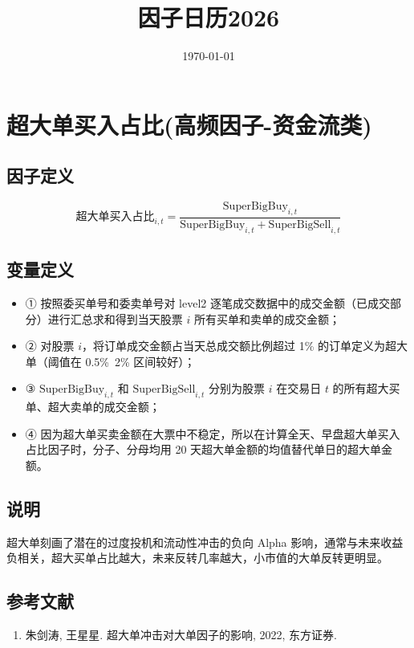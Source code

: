 \documentclass{article}
\title{因子日历2026}
\date{\today}
\begin{document}
\maketitle

\section{超大单买入占比(高频因子-资金流类)}

\subsection{因子定义}

\begin{equation}
    \text{超大单买入占比}_{i,t} = \frac{\mathrm{SuperBigBuy}_{i,t}}{\mathrm{SuperBigBuy}_{i,t} + \mathrm{SuperBigSell}_{i,t}}
\end{equation}

\subsection{变量定义}
\begin{itemize}
    \item ① 按照委买单号和委卖单号对 level2 逐笔成交数据中的成交金额（已成交部分）进行汇总求和得到当天股票 \( i \) 所有买单和卖单的成交金额；
    \item ② 对股票 \( i \)，将订单成交金额占当天总成交额比例超过 1\% 的订单定义为超大单（阈值在 0.5\%~2\% 区间较好）；
    \item ③ \( \mathrm{SuperBigBuy}_{i,t} \) 和 \( \mathrm{SuperBigSell}_{i,t} \) 分别为股票 \( i \) 在交易日 \( t \) 的所有超大买单、超大卖单的成交金额；
    \item ④ 因为超大单买卖金额在大票中不稳定，所以在计算全天、早盘超大单买入占比因子时，分子、分母均用 20 天超大单金额的均值替代单日的超大单金额。
\end{itemize}

\subsection{说明}
超大单刻画了潜在的过度投机和流动性冲击的负向 Alpha 影响，通常与未来收益负相关，超大买单占比越大，未来反转几率越大，小市值的大单反转更明显。

\subsection{参考文献}
\begin{enumerate}
    \item 朱剑涛, 王星星. 超大单冲击对大单因子的影响, 2022, 东方证券.
\end{enumerate}
\end{document}
